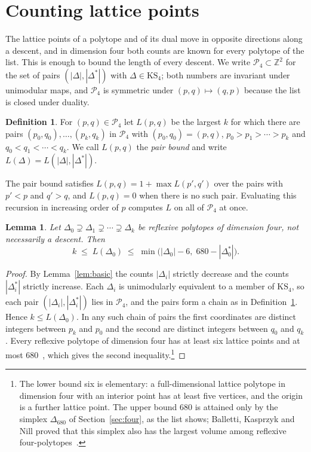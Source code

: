 \documentclass[manuscript]{aomart}
\newtheorem{lemma}[theorem]{Lemma}
\theoremstyle{definition}
\newtheorem{definition}[theorem]{Definition}
\theoremstyle{remark}
\newcommand{\Z}{\mathbb{Z}}
\newcommand{\KS}{\mathrm{KS}}
\newcommand{\Dbig}{\Delta_{680}}
\begin{document}
\section{Counting lattice points}\label{sec:counting}
\enlargethispage{4pt}

The lattice points of a polytope and of its dual move in opposite
directions along a descent, and in dimension four both counts are known for
every polytope of the list. This is enough to bound the length of every
descent. We write $\mathcal{P}_4\subset\Z^2$ for the set of pairs
$(|\Delta|,|\Delta^*|)$ with $\Delta\in\KS_4$; both numbers are invariant
under unimodular maps, and $\mathcal{P}_4$ is symmetric under
$(p,q)\mapsto(q,p)$ because the list is closed under duality.

\begin{definition}\label{def:pairbound}
For $(p,q)\in\mathcal{P}_4$ let $L(p,q)$ be the largest $k$ for which
there are pairs $(p_0,q_0),\dots,(p_k,q_k)$ in $\mathcal{P}_4$ with
$(p_0,q_0)=(p,q)$, $p_0>p_1>\cdots>p_k$ and $q_0<q_1<\cdots<q_k$. We call
$L(p,q)$ the \emph{pair bound} and write $L(\Delta)=L(|\Delta|,|\Delta^*|)$.
\end{definition}

The pair bound satisfies $L(p,q)=1+\max L(p',q')$ over the pairs with
$p'<p$ and $q'>q$, and $L(p,q)=0$ when there is no such pair. Evaluating
this recursion in increasing order of $p$ computes $L$ on all of
$\mathcal{P}_4$ at once.

\begin{lemma}\label{lem:counting}
Let $\Delta_0\supsetneq\Delta_1\supsetneq\cdots\supsetneq\Delta_k$ be
reflexive polytopes of dimension four, not necessarily a descent. Then
\[
k\;\le\;L(\Delta_0)\;\le\;\min\bigl(|\Delta_0|-6,\;680-|\Delta_0^*|\bigr).
\]
\end{lemma}

\begin{proof}
By Lemma~\ref{lem:basic} the counts $|\Delta_i|$ strictly decrease and the
counts $|\Delta_i^*|$ strictly increase. Each $\Delta_i$ is unimodularly
equivalent to a member of $\KS_4$, so each pair
$(|\Delta_i|,|\Delta_i^*|)$ lies in $\mathcal{P}_4$, and the pairs form a
chain as in Definition~\ref{def:pairbound}. Hence $k\le L(\Delta_0)$. In
any such chain of pairs the first coordinates are distinct integers between
$p_k$ and $p_0$ and the second are distinct integers between $q_0$ and
$q_k$. Every reflexive polytope of dimension four has at least six lattice
points and at most $680$~\cite{KS00}, which gives the second
inequality.\footnote{The lower bound six is elementary: a full-dimensional
lattice polytope in dimension four with an interior point has at least five
vertices, and the origin is a further lattice point. The upper bound $680$
is attained only by the simplex $\Dbig$ of Section~\ref{sec:four}, as the
list shows; Balletti, Kasprzyk and Nill proved that this simplex also has
the largest volume among reflexive four-polytopes~\cite{BKN22}.}
\end{proof}
\end{document}
